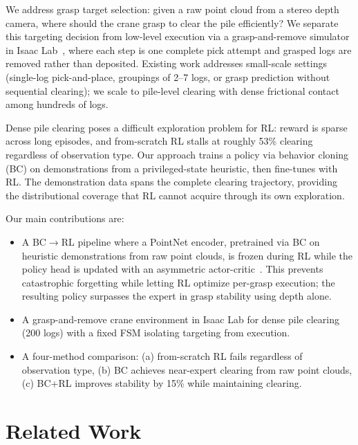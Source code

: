 \documentclass[conference]{IEEEtran}
\begin{document}
We address grasp target selection: given a raw point cloud from a stereo depth camera, where should the crane grasp to clear the pile efficiently?
We separate this targeting decision from low-level execution via a grasp-and-remove simulator in Isaac Lab~\cite{mittal2023orbit}, where each step is one complete pick attempt and grasped logs are removed rather than deposited.
Existing work addresses small-scale settings (single-log pick-and-place, groupings of 2--7 logs, or grasp prediction without sequential clearing); we scale to pile-level clearing with dense frictional contact among hundreds of logs.

Dense pile clearing poses a difficult exploration problem for RL: reward is sparse across long episodes, and from-scratch RL stalls at roughly 53\% clearing regardless of observation type.
Our approach trains a policy via behavior cloning (BC) on demonstrations from a privileged-state heuristic, then fine-tunes with RL.
The demonstration data spans the complete clearing trajectory, providing the distributional coverage that RL cannot acquire through its own exploration.

Our main contributions are:
\begin{itemize}
    \item A BC$\to$RL pipeline where a PointNet encoder, pretrained via BC on heuristic demonstrations from raw point clouds, is frozen during RL while the policy head is updated with an asymmetric actor-critic~\cite{pinto2018asymmetric}. This prevents catastrophic forgetting while letting RL optimize per-grasp execution; the resulting policy surpasses the expert in grasp stability using depth alone.
    \item A grasp-and-remove crane environment in Isaac Lab for dense pile clearing (200 logs) with a fixed FSM isolating targeting from execution.
    \item A four-method comparison: (a) from-scratch RL fails regardless of observation type, (b) BC achieves near-expert clearing from raw point clouds, (c) BC+RL improves stability by 15\% while maintaining clearing.
\end{itemize}

\section{Related Work}
\end{document}
